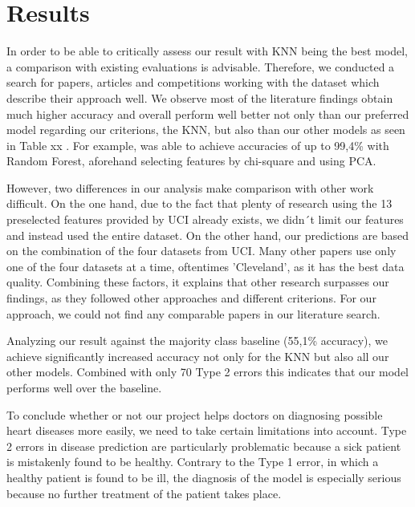 \section{Results} \label{sec:results}

In order to be able to critically assess our result with KNN being the best model, a comparison with existing evaluations is advisable. Therefore, we conducted a search for papers, articles and competitions working with the dataset which describe their approach well. We observe most of the literature findings obtain much higher accuracy \citep{alotaibi2019, garate-escamila2020, uyar2017} and overall perform well better not only than our preferred model regarding our criterions, the KNN, but also than our other models as seen in Table xx . For example, \citet{garate-escamila2020} was able to achieve accuracies of up to 99,4\% with Random Forest, aforehand selecting features by chi-square and using PCA.  

However, two differences in our analysis make comparison with other work difficult. On the one hand, due to the fact that plenty of research using the 13 preselected features provided by UCI already exists, we didn´t limit our features and instead used the entire dataset. On the other hand, our predictions are based on the combination of the four datasets from UCI. Many other papers use only one of the four datasets at a time, oftentimes 'Cleveland', as it has the best data quality. Combining these factors, it explains that other research surpasses our findings, as they followed other approaches and different criterions. For our approach, we could not find any comparable papers in our literature search. 

Analyzing our result against the majority class baseline (55,1\% accuracy), we achieve significantly increased accuracy not only for the KNN but also all our other models. Combined with only 70 Type 2 errors this indicates that our model performs well over the baseline. 

To conclude whether or not our project helps doctors on diagnosing possible heart diseases more easily, we need to take certain limitations into account. Type 2 errors in disease prediction are particularly problematic because a sick patient is mistakenly found to be healthy. Contrary to the Type 1 error, in which a healthy patient is found to be ill, the diagnosis of the model is especially serious because no further treatment of the patient takes place.  


